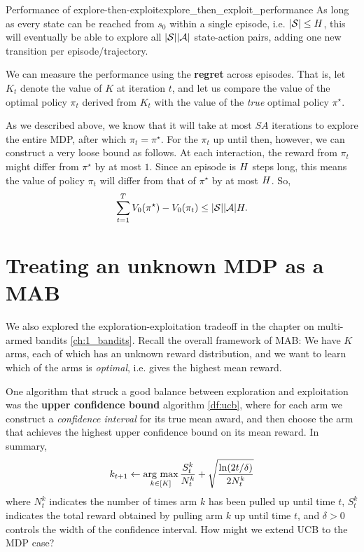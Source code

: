 \documentclass[\main/main]{subfiles}
\begin{document}
\begin{theorem}{Performance of explore-then-exploit}{explore_then_exploit_performance}
    As long as every state can be reached from $s_0$ within a single episode, i.e. $|\mathcal{S}| \le H$, this will eventually be able to explore all $|\mathcal{S}| |\mathcal{A}|$ state-action pairs, adding one new transition per episode/trajectory.

    We can measure the performance using the \textbf{regret} across episodes. That is, let $K_t$ denote the value of $K$ at iteration $t$, and let us compare the value of the optimal policy $\pi_t$ derived from $K_t$ with the value of the \emph{true} optimal policy $\pi^\star$.

    As we described above, we know that it will take at most $SA$ iterations to explore the entire MDP, after which $\pi_t = \pi^\star$.
    For the $\pi_t$ up until then, however, we can construct a very loose bound as follows.
    At each interaction, the reward from $\pi_t$ might differ from $\pi^\star$ by at most $1$.
    Since an episode is $H$ steps long, this means the value of policy $\pi_t$ will differ from that of $\pi^\star$ by at most $H$.
    So,
    \[
        \sum_{t=1}^T V_0(\pi^\star) - V_0(\pi_t) \le |\mathcal{S}||\mathcal{A}| H.
    \]
\end{theorem}

\section{Treating an unknown MDP as a MAB}

We also explored the exploration-exploitation tradeoff in the chapter on multi-armed bandits \eqref{ch:1_bandits}.
Recall the overall framework of MAB:
We have $K$ arms, each of which has an unknown reward distribution,
and we want to learn which of the arms is \emph{optimal}, i.e. gives the highest mean reward.

One algorithm that struck a good balance between exploration and exploitation was the \textbf{upper confidence bound} algorithm \eqref{df:ucb},
where for each arm we construct a \emph{confidence interval} for its true mean award, and then choose the arm that achieves the highest upper confidence bound on its mean reward. In summary,
\[k_{t+1} \gets \operatorname*{\textrm{arg\ max}}_{k \in [K]} \frac{S^{k}_t}{N^{k}_t} + \sqrt{\frac{\ln(2t/\delta)}{2 N^{k}_t}}\]
where $N_t^k$ indicates the number of times arm $k$ has been pulled up until time $t$,
$S_t^k$ indicates the total reward obtained by pulling arm $k$ up until time $t$,
and $\delta > 0$ controls the width of the confidence interval.
How might we extend UCB to the MDP case?
\end{document}

